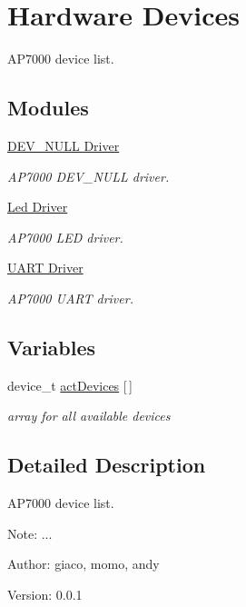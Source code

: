 \hypertarget{group__ap7000__hardware__devices}{
\section{Hardware Devices}
\label{group__ap7000__hardware__devices}
}
AP7000 device list.  


\subsection*{Modules}
\begin{CompactItemize}
\item 
\hyperlink{group___d_e_v___n_u_l_l___d_r_i_v_e_r}{DEV\_\-NULL Driver}
\begin{CompactList}\small\item\em AP7000 DEV\_\-NULL driver. \item\end{CompactList}

\item 
\hyperlink{group___l_e_d___d_r_i_v_e_r}{Led Driver}
\begin{CompactList}\small\item\em AP7000 LED driver. \item\end{CompactList}

\item 
\hyperlink{group___u_a_r_t___d_r_i_v_e_r}{UART Driver}
\begin{CompactList}\small\item\em AP7000 UART driver. \item\end{CompactList}

\end{CompactItemize}
\subsection*{Variables}
\begin{CompactItemize}
\item 
\hypertarget{group__ap7000__hardware__devices_ga20a83acab6e9ba5c69b47092a295521}{
device\_\-t \hyperlink{group__ap7000__hardware__devices_ga20a83acab6e9ba5c69b47092a295521}{actDevices} \mbox{[}$\,$\mbox{]}}
\label{group__ap7000__hardware__devices_ga20a83acab6e9ba5c69b47092a295521}

\begin{CompactList}\small\item\em array for all available devices \item\end{CompactList}\end{CompactItemize}


\subsection{Detailed Description}
AP7000 device list. 

\begin{Desc}
\item[Note:]... \end{Desc}
\begin{Desc}
\item[Author:]giaco, momo, andy \end{Desc}
\begin{Desc}
\item[Version:]0.0.1 \end{Desc}
